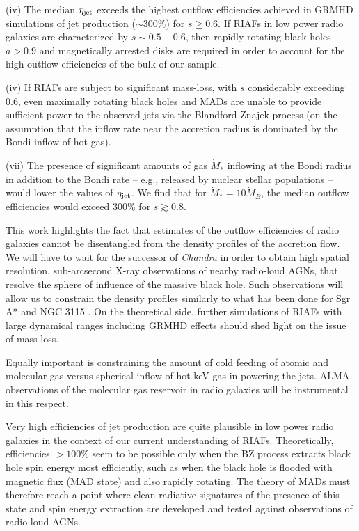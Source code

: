 \documentclass[useAMS,usenatbib]{mn2e}
\begin{document}
(iv) The median $\eta_{\rm jet}$ exceeds the highest outflow efficiencies achieved in GRMHD simulations of jet production ($\sim 300\%$) for $s \geq 0.6$. If RIAFs in low power radio galaxies are characterized by $s \sim 0.5-0.6$, then rapidly rotating black holes $a>0.9$ and magnetically arrested disks are required in order to account for the high outflow efficiencies of the bulk of our sample. 

(iv) If RIAFs are subject to significant mass-loss, with $s$ considerably exceeding 0.6, even maximally rotating black holes and MADs are unable to provide sufficient power to the observed jets via the Blandford-Znajek process (on the assumption that the inflow rate near the accretion radius is dominated by the Bondi inflow of hot gas).

(vii) The presence of significant amounts of gas $\dot{M}_*$ inflowing at the Bondi radius in addition to the Bondi rate -- e.g., released by nuclear stellar populations -- would lower the values of $\eta_{\rm jet}$. We find that for $\dot{M}_*=10 \dot{M}_B$, the median outflow efficiencies would exceed 300\% for $s \gtrsim 0.8$.

This work highlights the fact that estimates of the outflow efficiencies of radio galaxies cannot be disentangled from the density profiles of the accretion flow. We will have to wait for the successor of \emph{Chandra} in order to obtain high spatial resolution, sub-arcsecond X-ray observations of nearby radio-loud AGNs, that resolve the sphere of influence of the massive black hole.  Such observations will allow us to constrain the density profiles similarly to what has been done for Sgr A* and NGC 3115 \citep{Wang13,Wong14}. On the theoretical side, further simulations of RIAFs with large dynamical ranges including GRMHD effects should shed light on the issue of mass-loss.

Equally important is constraining the amount of cold feeding of atomic and molecular gas versus spherical inflow of hot keV gas in powering the jets. ALMA observations of the molecular gas reservoir in radio galaxies will be instrumental in this respect. 

Very high efficiencies of jet production are quite plausible in low power radio galaxies in the context of our current understanding of RIAFs. Theoretically, efficiencies $> 100\%$ seem to be possible only when the BZ process extracts black hole spin energy most efficiently, such as when the black hole is flooded with magnetic flux (MAD state) and also rapidly rotating. The theory of MADs must therefore reach a point where clean radiative signatures of the presence of this state and spin energy extraction are developed and tested against observations of radio-loud AGNs. 
\end{document}
